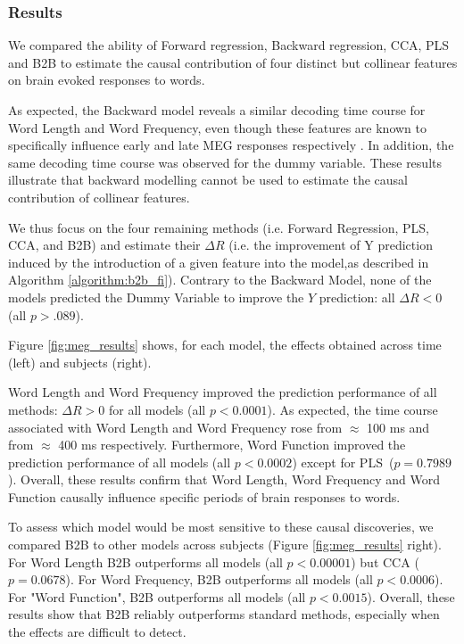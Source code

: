 \subsubsection{Results}
We compared the ability of Forward regression, Backward regression, CCA, PLS and B2B to estimate the causal contribution of four distinct but collinear features on brain evoked responses to words.

As expected, the Backward model reveals a similar decoding time course for Word Length and Word Frequency, even though these features are known to specifically influence early and late MEG responses respectively \citep{kutas2011thirty}. In addition, the same decoding time course was observed for the dummy variable. These results illustrate that backward modelling cannot be used to estimate the causal contribution of collinear features.

We thus focus on the four remaining methods (i.e. Forward Regression, PLS, CCA, and B2B) and estimate their $\Delta R$ (i.e. the improvement of Y prediction induced by the introduction of a given feature into the model,as described in Algorithm \ref{algorithm:b2b_fi}). Contrary to the Backward Model, none of the models predicted the Dummy Variable to improve the $Y$ prediction: all $\Delta R < 0$ (all $p > .089$).

Figure \ref{fig:meg_results} shows, for each model, the effects obtained across time (left) and subjects (right).

Word Length and Word Frequency improved the prediction performance of all methods: $\Delta R>0$ for all models (all $p<0.0001$). As expected, the time course associated with Word Length and Word Frequency rose from $\approx$ 100 ms and from $\approx$ 400 ms respectively. Furthermore, Word Function improved the prediction performance of all models (all $p < 0.0002$) except for PLS~($p=0.7989$). Overall, these results confirm that Word Length, Word Frequency and Word Function causally influence specific periods of brain responses to words.

To assess which model would be most sensitive to these causal discoveries, we compared B2B to other models across subjects (Figure \ref{fig:meg_results} right). For Word Length B2B outperforms all models (all $p < 0.00001$) but CCA ($p=0.0678$). For Word Frequency, B2B outperforms all models (all $p < 0.0006$). For "Word Function", B2B outperforms all models (all $p < 0.0015$). Overall, these results show that B2B reliably outperforms standard methods, especially when the effects are difficult to detect.
